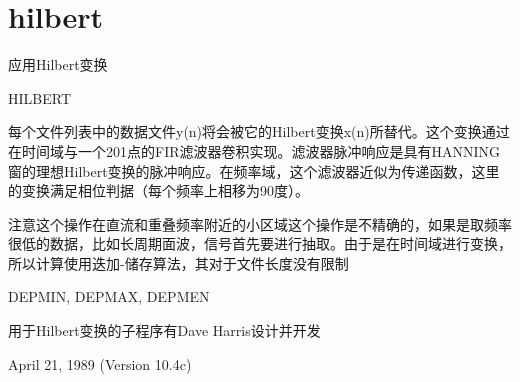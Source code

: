 \section{hilbert}
\label{cmd:hilbert}

应用Hilbert变换

HILBERT

每个文件列表中的数据文件y(n)将会被它的Hilbert变换x(n)所替代。这个变换通过在时间域与一个201点的FIR滤波器卷积实现。滤波器脉冲响应是具有HANNING窗的理想Hilbert变换的脉冲响应。在频率域，这个滤波器近似为传递函数，这里的变换满足相位判据（每个频率上相移为90度）。

注意这个操作在直流和重叠频率附近的小区域这个操作是不精确的，如果是取频率很低的数据，比如长周期面波，信号首先要进行抽取。由于是在时间域进行变换，所以计算使用迭加-储存算法，其对于文件长度没有限制

DEPMIN, DEPMAX, DEPMEN

用于Hilbert变换的子程序有Dave Harris设计并开发

April 21, 1989 (Version 10.4c)
